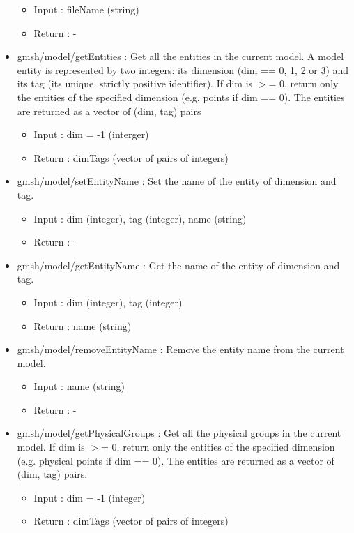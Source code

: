 \documentclass[dvipdfmx, 9pt, a4paper]{article}
\numberwithin{equation}{section}
\begin{document}
\begin{itemize}
\begin{itemize}
\item Input : fileName (string)
\item Return : -
\end{itemize}
\item gmsh/model/getEntities : Get all the entities in the current model. A model entity is represented by two integers: its dimension (dim == 0, 1, 2 or 3) and its tag (its unique, strictly positive identifier). If dim is $>$= 0, return only the entities of the specified dimension (e.g. points if dim == 0). The entities are returned as a vector of (dim, tag) pairs
\begin{itemize}
\item Input : dim = -1 (interger)
\item Return : dimTags (vector of pairs of integers)
\end{itemize}
\item gmsh/model/setEntityName : Set the name of the entity of dimension and tag.
\begin{itemize}
\item Input : dim (integer), tag (integer), name (string)
\item Return : -
\end{itemize}
\item gmsh/model/getEntityName : Get the name of the entity of dimension and tag.
\begin{itemize}
\item Input : dim (integer), tag (integer)
\item Return : name (string)
\end{itemize}
\item gmsh/model/removeEntityName : Remove the entity name from the current model.
\begin{itemize}
\item Input : name (string)
\item Return : -
\end{itemize}
\item gmsh/model/getPhysicalGroups : Get all the physical groups in the current model. If dim is $>$= 0, return only the entities of the specified dimension (e.g. physical points if dim == 0). The entities are returned as a vector of (dim, tag) pairs.
\begin{itemize}
\item Input : dim = -1 (integer)
\item Return : dimTags (vector of pairs of integers)
\end{itemize}

\end{itemize}
\end{document}
